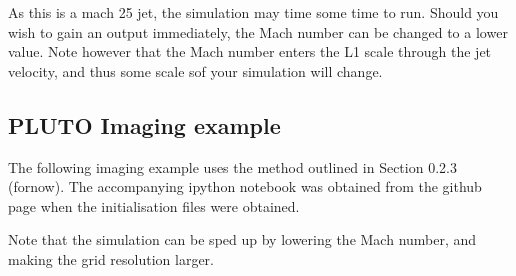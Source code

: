 \documentclass[12pt,a4paper]{report}
\begin{document}
As this is a mach 25 jet, the simulation may time some time to run. Should you wish to gain an output immediately, the Mach number can be changed to a lower value. Note however that the Mach number enters the L1 scale through the jet velocity, and thus some scale sof your simulation will change.
\subsection{PLUTO Imaging example}
	
The following imaging example uses the method outlined in Section 0.2.3 (fornow). The accompanying ipython notebook was obtained from the github page when the initialisation files were obtained.

Note that the simulation can be sped up by lowering the Mach number, and making the grid resolution larger.
\end{document}
